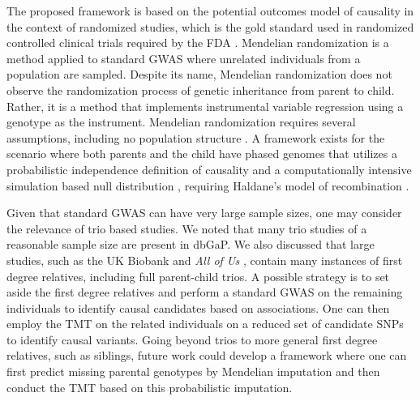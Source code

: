 \documentclass[12pt]{extarticle}
\begin{document}
{The proposed framework is based on the potential outcomes model of causality in the context of randomized studies, which is the gold standard used in randomized controlled clinical trials required by the FDA \citep{fda1998}. Mendelian randomization is a method applied to standard GWAS where unrelated individuals from a population are sampled. Despite its name, Mendelian randomization does not observe the randomization process of genetic inheritance from parent to child. Rather, it is a method that implements instrumental variable regression using a genotype as the instrument. Mendelian randomization requires several assumptions, including no population structure \citep{bochud2008}. A framework exists for the scenario where both parents and the child have phased genomes that utilizes a probabilistic independence definition of causality \citep{pearl2009} and a computationally intensive simulation based null distribution \citep{bates2020}, requiring Haldane's model of recombination \citep{lange2002}. 

Given that standard GWAS can have very large sample sizes, one may consider the relevance of trio based studies. We noted that many trio studies of a reasonable sample size are present in dbGaP. We also discussed that large studies, such as the UK Biobank \citep{bycroft2018} and \textit{All of Us} \citep{allofus2024},  contain many instances of first degree relatives, including full parent-child trios. A possible strategy is to set aside the first degree relatives and perform a standard GWAS on the remaining individuals to identify causal candidates based on associations. One can then employ the TMT on the related individuals on a reduced set of candidate SNPs to identify causal variants.  Going beyond trios to more general first degree relatives, such as siblings, future work could develop a framework where one can first predict missing parental genotypes by Mendelian imputation \citep{young2022} and then conduct the TMT based on this probabilistic imputation.

%

}
\end{document}
